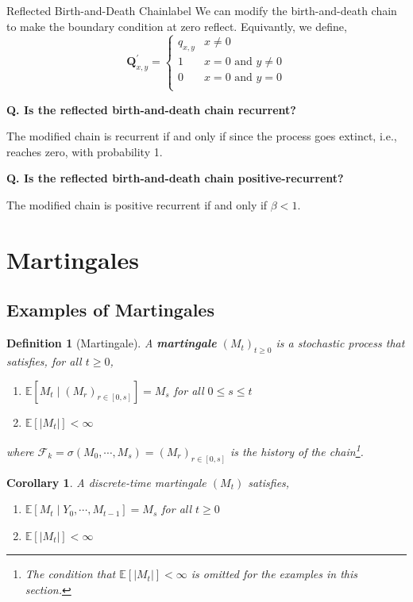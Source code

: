 \documentclass{tufte-handout}
\newtheorem{cor}[thm]{Corollary}
\newtheorem{defn}[thm]{Definition}
\begin{document}
\begin{ex}{Reflected Birth-and-Death Chain}{label}
  We can modify the birth-and-death chain to make the boundary condition at zero reflect. Equivantly, we define,
  \[
  \mathbf{Q}^{\prime}_{x,y} = \begin{cases}
                        q_{x,y} & x \neq 0 \\
                        1 & x = 0 \text{ and } y \neq 0 \\
                        0 & x = 0 \text{ and } y = 0 \\
                            \end{cases}
  \]

  \textbf{Q. Is the reflected birth-and-death chain recurrent?}

  The modified chain is recurrent if and only if  since the process goes extinct, i.e., reaches zero, with probability 1. 

  \vphantom{.}

  \textbf{Q. Is the reflected birth-and-death chain positive-recurrent?}

  The modified chain is positive recurrent if and only if $\beta < 1$.
\end{ex}

\section{Martingales}
\subsection{Examples of Martingales}
\begin{defn}[Martingale]
  A \textbf{martingale} $(M_t)_{t \geq 0}$ is a stochastic process that satisfies, for all $t \geq 0$,
  \begin{enumerate}
    \item $\mathbb{E}[M_t \mid (M_r)_{r \in [0,s]}] = M_s$ for all $0 \leq s \leq t$
    \item $\mathbb{E}[|M_t|] < \infty$
  \end{enumerate}
  \noindent where $\mathcal{F}_k = \sigma(M_0, \cdots, M_s) = (M_r)_{r \in [0,s]}$ is the history of the chain\footnote{The condition that $\mathbb{E}[|M_t|] < \infty$ is omitted for the examples in this section.}.
\end{defn}

\begin{cor}
  A discrete-time martingale $(M_t)$ satisfies,
  \begin{enumerate}
    \item $\mathbb{E}[M_t \mid Y_0, \cdots, M_{t-1}] = M_s$ for all $t \geq 0$
    \item $\mathbb{E}[|M_t|] < \infty$
  \end{enumerate}
\end{cor}
\end{document}
